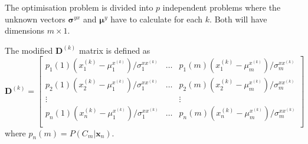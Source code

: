 The optimisation problem is divided into $p$ independent problems where the unknown vectors $\boldsymbol{\sigma}^{yx}$ and $\boldsymbol{\mu}^{y}$ have to calculate for each $k$. Both will have dimensions $m\times 1$.

The modified $\mathbf{D}^{(k)}$ matrix is defined as
\begin{equation}
	\label{eq:D_matrix_new}
	\mathbf{D}^{(k)} = \begin{bmatrix}
		p_1(1)(x_1^{(k)} - \mu_1^{x^{(k)}})/\sigma_1^{xx^{(k)}} & \dots & p_1(m)(x_1^{(k)} - \mu_m^{x^{(k)}})/\sigma_m^{xx^{(k)}} \\
		p_2(1)(x_2^{(k)} - \mu_1^{x^{(k)}})/\sigma_1^{xx^{(k)}} & \dots & p_2(m)(x_2^{(k)} - \mu_m^{x^{(k)}})/\sigma_m^{xx^{(k)}} \\
		\vdots & & \vdots \\
		p_n(1)(x_n^{(k)} - \mu_1^{x^{(k)}})/\sigma_1^{xx^{(k)}} & \dots & p_n(m)(x_n^{(k)} - \mu_m^{x^{(k)}})/\sigma_m^{xx^{(k)}} \\
	\end{bmatrix}
\end{equation}
where $p_n(m)=P(C_m\vert \mathbf{x}_n)$.
